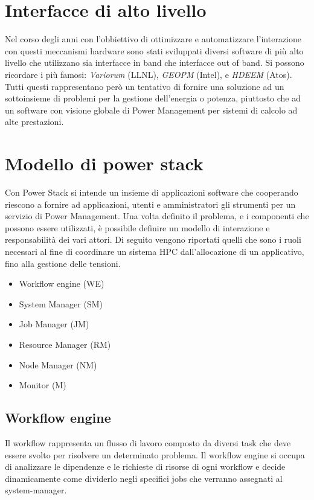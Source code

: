 \section{Interfacce di alto livello}
Nel corso degli anni con l'obbiettivo di ottimizzare e automatizzare l'interazione con questi meccanismi hardware sono stati sviluppati diversi software di più alto livello che utilizzano sia interfacce in band che interfacce out of band. Si possono ricordare i più famosi: \emph{Variorum} (LLNL), \emph{GEOPM} (Intel)\cite{GEOPM}, e \emph{HDEEM} (Atos)\cite{HDEEM}. Tutti questi rappresentano però un tentativo di fornire una soluzione ad un sottoinsieme di problemi per la gestione dell'energia o potenza, piuttosto che ad un software con visione globale di Power Management per sistemi di calcolo ad alte prestazioni. %


\section{Modello di power stack} %
Con Power Stack si intende un insieme di applicazioni software che cooperando riescono a fornire ad applicazioni, utenti e amministratori gli strumenti per un servizio di Power Management. Una volta definito il problema, e i componenti che possono essere utilizzati, è possibile definire un modello di interazione e responsabilità dei vari attori. Di seguito vengono riportati quelli che sono i ruoli necessari al fine di coordinare un sistema HPC dall'allocazione di un applicativo, fino alla gestione delle tensioni. 
\begin{itemize}
    \item Workflow engine (WE)
    \item System Manager (SM)
    \item Job Manager (JM)
    \item Resource Manager (RM)
    \item Node Manager (NM)
    \item Monitor (M)
\end{itemize}

\subsection{Workflow engine}
Il workflow rappresenta un flusso di lavoro composto da diversi task che deve essere svolto per risolvere un determinato problema. Il workflow engine si occupa di analizzare le dipendenze e le richieste di risorse di ogni workflow e decide dinamicamente come dividerlo negli specifici jobs che verranno assegnati al system-manager. %

